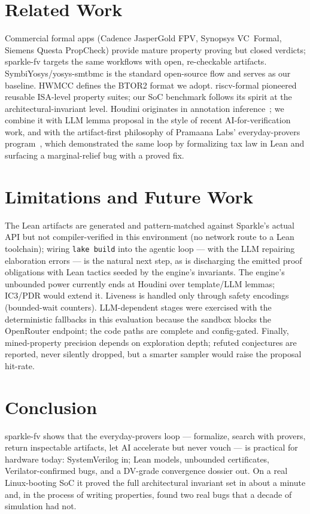 \documentclass[11pt]{article}
\newcommand{\sfv}{\textsf{sparkle-fv}}
\newcommand{\tool}[1]{\textsf{#1}}
\begin{document}
\section{Related Work}

Commercial formal apps (Cadence JasperGold FPV, Synopsys VC~Formal, Siemens
Questa PropCheck) provide mature property proving but closed verdicts;
\sfv{} targets the same workflows with open, re-checkable artifacts.
SymbiYosys/\tool{yosys-smtbmc} is the standard open-source flow and serves
as our baseline. HWMCC defines the BTOR2 format we adopt. riscv-formal
pioneered reusable ISA-level property suites; our SoC benchmark follows its
spirit at the architectural-invariant level. Houdini originates in annotation
inference~\cite{houdini}; we combine it with LLM lemma proposal in the style
of recent AI-for-verification work, and with the artifact-first philosophy
of Pramaana Labs' everyday-provers program~\cite{pramaana}, which
demonstrated the same loop by formalizing tax law in Lean and surfacing a
marginal-relief bug with a proved fix.

\section{Limitations and Future Work}

The Lean artifacts are generated and pattern-matched against Sparkle's
actual API but not compiler-verified in this environment (no network route
to a Lean toolchain); wiring \texttt{lake build} into the agentic loop ---
with the LLM repairing elaboration errors --- is the natural next step, as
is discharging the emitted proof obligations with Lean tactics seeded by the
engine's invariants. The engine's unbounded power currently ends at Houdini
over template/LLM lemmas; IC3/PDR would extend it. Liveness is handled only
through safety encodings (bounded-wait counters). LLM-dependent stages were
exercised with the deterministic fallbacks in this evaluation because the
sandbox blocks the OpenRouter endpoint; the code paths are complete and
config-gated. Finally, mined-property precision depends on exploration
depth; refuted conjectures are reported, never silently dropped, but a
smarter sampler would raise the proposal hit-rate.

\section{Conclusion}

\sfv{} shows that the everyday-provers loop --- formalize, search with
provers, return inspectable artifacts, let AI accelerate but never vouch ---
is practical for hardware today: SystemVerilog in; Lean models, unbounded
certificates, Verilator-confirmed bugs, and a DV-grade convergence dossier
out. On a real Linux-booting SoC it proved the full architectural invariant
set in about a minute and, in the process of writing properties, found two
real bugs that a decade of simulation had not.
\end{document}

